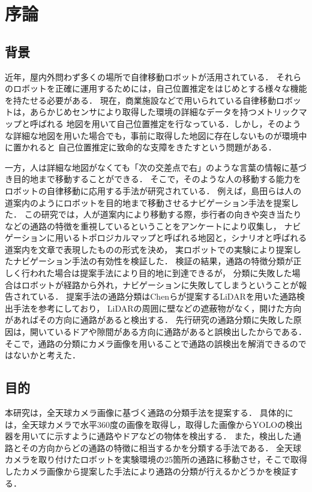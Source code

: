 \documentclass[../main]{subfiles}
\begin{document}
    \setcounter{secnumdepth}{2}
    \chapter{序論}
        \section{背景}
        近年，屋内外問わず多くの場所で自律移動ロボットが活用されている．
        それらのロボットを正確に運用するためには，自己位置推定をはじめとする様々な機能を持たせる必要がある．
        現在，商業施設などで用いられている自律移動ロボットは，あらかじめセンサにより取得した環境の詳細なデータを持つメトリックマップと呼ばれる
        地図を用いて自己位置推定を行なっている．しかし，そのような詳細な地図を用いた場合でも，事前に取得した地図に存在しないものが環境中に置かれると
        自己位置推定に致命的な支障をきたすという問題がある．
        
        
        一方，人は詳細な地図がなくても「次の交差点で右」のような言葉の情報に基づき目的地まで移動することができる．
        そこで，そのような人の移動する能力をロボットの自律移動に応用する手法が研究されている．
        例えば，島田らは人の道案内のようにロボットを目的地まで移動させるナビゲーション手法を提案した\cite{shimada_paper1}\cite{shimada_paper2}．
        この研究では，人が道案内により移動する際，歩行者の向きや突き当たりなどの通路の特徴を重視しているということをアンケートにより収集し，
        ナビゲーションに用いるトポロジカルマップと呼ばれる地図と，シナリオと呼ばれる道案内を文章で表現したものの形式を決め，
        実ロボットでの実験により提案したナビゲーション手法の有効性を検証した．
        検証の結果，通路の特徴分類が正しく行われた場合は提案手法により目的地に到達できるが，
        分類に失敗した場合はロボットが経路から外れ，ナビゲーションに失敗してしまうということが報告されている．
        提案手法の通路分類はChenらが提案するLiDARを用いた通路検出手法\cite{toe_finding_algolithm}を参考にしており，
        LiDARの周囲に壁などの遮蔽物がなく，開けた方向があればその方向に通路があると検出する．
        先行研究の通路分類に失敗した原因は，開いているドアや隙間がある方向に通路があると誤検出したからである．
        そこで，通路の分類にカメラ画像を用いることで通路の誤検出を解消できるのではないかと考えた．

        \newpage

        \section{目的}
        本研究は，全天球カメラ画像に基づく通路の分類手法を提案する．
        具体的には，全天球カメラで水平360度の画像を取得し，取得した画像からYOLO\cite{yolov5}の検出器を用いてに示すように通路やドアなどの物体を検出する．
        また，検出した通路とその方向からどの通路の特徴に相当するかを分類する手法である．
        全天球カメラを取り付けたロボットを実験環境の25箇所の通路に移動させ，そこで取得したカメラ画像から提案した手法により通路の分類が行えるかどうかを検証する．
        
\end{document}
